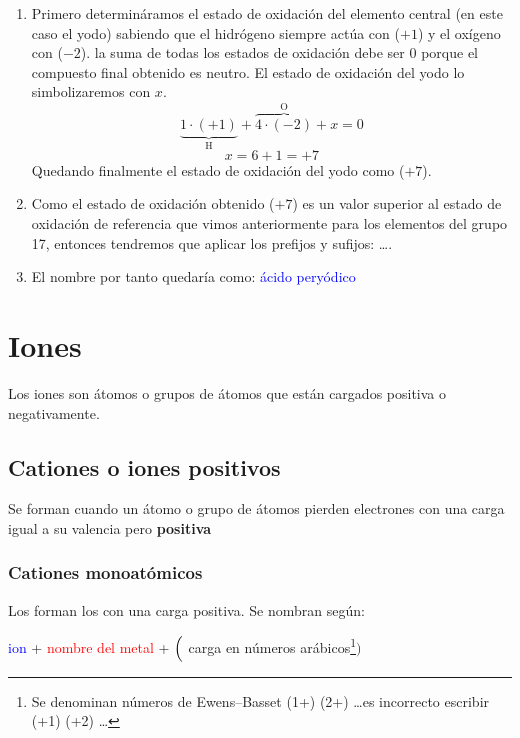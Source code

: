 \documentclass[12pt]{article}
\begin{document}
\begin{enumerate}[label=\numberballgreen]
    \item Primero determináramos el estado de oxidación del elemento central (en este caso el yodo) sabiendo que el hidrógeno siempre actúa con ($+1$) y el oxígeno con ($-2$). la suma de todas los estados de oxidación debe ser $0$ porque el compuesto final obtenido es neutro. El estado de oxidación del yodo lo simbolizaremos con $x$.
          \begin{equation*}
              \underbrace{1\cdot(+1)}_{\text{H}} + \overbrace{4\cdot(-2)}^{\text{O}} + x = 0
          \end{equation*}
          \begin{equation*}
              x = 6+1 = +7
          \end{equation*}
          Quedando finalmente el estado de oxidación del yodo como ($+7$).
    \item Como el estado de oxidación obtenido ($+7$) es un valor superior al estado de oxidación de referencia que vimos anteriormente para los elementos del grupo 17, entonces tendremos que aplicar los prefijos y sufijos:  \dots {}.
    \item El nombre por tanto quedaría como: \textcolor{blue}{ácido peryódico}
\end{enumerate}

\section{Iones}

Los iones son átomos o grupos de átomos que están cargados positiva o negativamente.

\subsection{Cationes o iones positivos}

Se forman cuando un átomo o grupo de átomos pierden electrones con una carga igual a su valencia pero \textbf{positiva}

\subsubsection{Cationes monoatómicos}
Los forman los  con una carga positiva. Se nombran según:
\begin{center}
    \textcolor{blue}{ion} + \textcolor{red}{nombre del metal} + $\Bigl($ \textcolor{mygreen}{carga en números arábicos\footnote{Se denominan números de Ewens--Basset (1+) (2+) \dots es incorrecto escribir (+1) (+2) \dots}}$\Bigr)$
\end{center}
\end{document}

